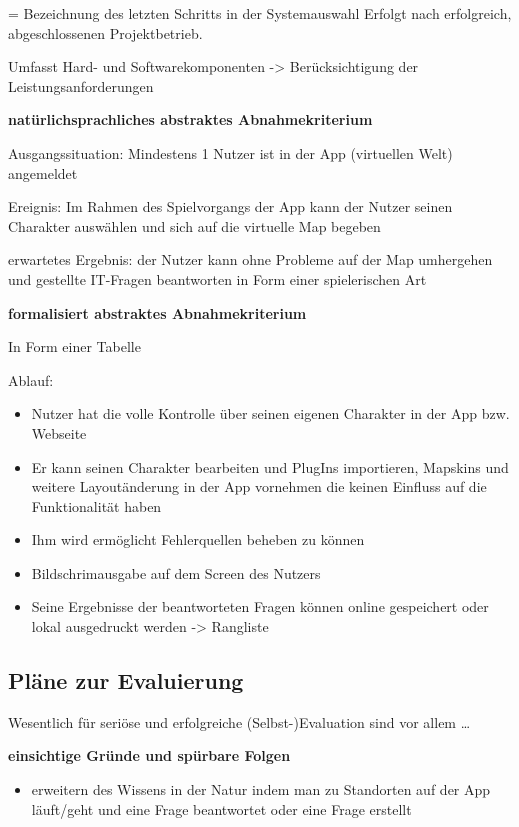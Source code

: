 = Bezeichnung des letzten Schritts in der Systemauswahl
Erfolgt nach erfolgreich, abgeschlossenen Projektbetrieb.

Umfasst Hard- und Softwarekomponenten -> Berücksichtigung der Leistungsanforderungen

\textbf {natürlichsprachliches abstraktes Abnahmekriterium}

Ausgangssituation:
Mindestens 1 Nutzer ist in der App (virtuellen Welt) angemeldet

Ereignis:
Im Rahmen des Spielvorgangs der App kann der Nutzer seinen Charakter auswählen und sich auf die virtuelle Map begeben

erwartetes Ergebnis:
der Nutzer kann ohne Probleme auf der Map umhergehen und gestellte IT-Fragen beantworten in Form einer spielerischen Art


\textbf {formalisiert abstraktes Abnahmekriterium}

In Form einer Tabelle

Ablauf:


\begin{itemize}
	\item Nutzer hat die volle Kontrolle über seinen eigenen Charakter in der App bzw. Webseite
	
	\item Er kann seinen Charakter bearbeiten und PlugIns importieren, Mapskins und weitere Layoutänderung in der App vornehmen die       keinen Einfluss auf die Funktionalität haben
	
	\item Ihm wird ermöglicht Fehlerquellen beheben zu können 
	
	\item Bildschrimausgabe auf dem Screen des Nutzers
	
	\item Seine Ergebnisse der beantworteten Fragen können online
	 gespeichert oder lokal ausgedruckt werden -> Rangliste 
	 
\end{itemize}


\subsection{Pläne zur Evaluierung}

Wesentlich für seriöse und erfolgreiche (Selbst-)Evaluation sind vor allem …



\textbf {einsichtige Gründe und spürbare Folgen}
\begin{itemize}
	\item erweitern des Wissens in der Natur indem man zu Standorten auf der App läuft/geht und eine Frage beantwortet oder eine Frage erstellt
\end{itemize}




